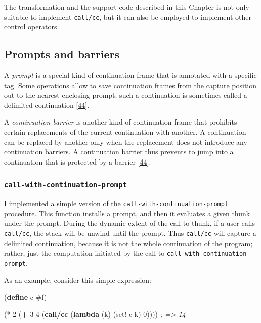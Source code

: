 \documentclass[12pt,a4paper,oneside,openright]{book}
\newenvironment{Shaded}{\begin{snugshade}}{\end{snugshade}}
\newcommand{\KeywordTok}[1]{\textcolor[rgb]{0.13,0.29,0.53}{\textbf{{#1}}}}
\newcommand{\DecValTok}[1]{\textcolor[rgb]{0.00,0.00,0.81}{{#1}}}
\newcommand{\CommentTok}[1]{\textcolor[rgb]{0.56,0.35,0.01}{\textit{{#1}}}}
\newcommand{\FunctionTok}[1]{\textcolor[rgb]{0.00,0.00,0.00}{{#1}}}
\newcommand{\NormalTok}[1]{{#1}}
\begin{document}
The transformation and the support code described in this Chapter is not
only suitable to implement \texttt{call/cc}, but it can also be employed
to implement other control operators.

\subsection{Prompts and barriers}\label{prompts-and-barriers}

A \emph{prompt} is a special kind of continuation frame that is
annotated with a specific tag. Some operations allow to save
continuation frames from the capture position out to the nearest
enclosing prompt; such a continuation is sometimes called a delimited
continuation {[}\hyperref[ref-EvaluationRacket2015]{44}{]}.

A \emph{continuation barrier} is another kind of continuation frame that
prohibits certain replacements of the current continuation with another.
A continuation can be replaced by another only when the replacement does
not introduce any continuation barriers. A continuation barrier thus
prevents to jump into a continuation that is protected by a barrier
{[}\hyperref[ref-EvaluationRacket2015]{44}{]}.

\subsubsection{\texorpdfstring{\texttt{call-with-continuation-prompt}}{call-with-continuation-prompt}}\label{call-with-continuation-prompt}

I implemented a simple version of the
\texttt{call-with-continuation-prompt} procedure. This function installs
a prompt, and then it evaluates a given thunk under the prompt. During
the dynamic extent of the call to thunk, if a user calls
\texttt{call/cc}, the stack will be unwind until the prompt. Thus
\texttt{call/cc} will capture a delimited continuation, because it is
not the whole continuation of the program; rather, just the computation
initiated by the call to \texttt{call-with-continuation-prompt}.

As an example, consider this simple expression:

\begin{Shaded}
\begin{Highlighting}[]
    \NormalTok{(}\KeywordTok{define}\FunctionTok{ c }\DecValTok{#f}\NormalTok{)}

    \NormalTok{(* }\DecValTok{2}
     \NormalTok{(}\KeywordTok{+} \DecValTok{3} \DecValTok{4}
        \NormalTok{(}\KeywordTok{call/cc}
         \NormalTok{(}\KeywordTok{lambda} \NormalTok{(k)}
           \NormalTok{(set! c k)}
           \DecValTok{0}\NormalTok{)))) }\CommentTok{; => 14}
\end{Highlighting}
\end{Shaded}
\end{document}
